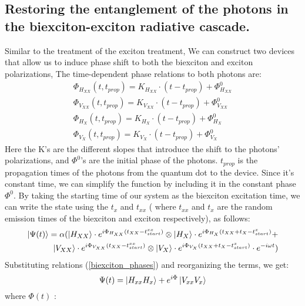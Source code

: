 \subsection*{Restoring the entanglement of the photons in the biexciton-exciton radiative cascade.}
Similar to the treatment of the exciton treatment, We can construct two devices that allow us to induce phase shift to both the biexciton and exciton polarizations, The time-dependent phase relations to both photons are: 
\begin{equation} \label{biexciton_phases}
	\begin{aligned} 
		&\Phi_{H_{XX}}{(t,t_{prop})} = K_{H_{XX}}\cdot(t-t_{prop}) + \Phi^0_{H_{XX}} & \\	&\Phi_{V_{XX}}{(t,t_{prop})} = K_{V_{XX}}\cdot(t-t_{prop}) + \Phi^0_{V_{XX}} \\
		&\Phi_{H_{X}}{(t,t_{prop})} = K_{H_{X}}\cdot(t-t_{prop}) + \Phi^0_{H_{X}} &\\
		&\Phi_{V_{X}}{(t,t_{prop})} = K_{V_{X}}\cdot(t-t_{prop}) + \Phi^0_{V_{X}} 
	\end{aligned}
\end{equation}
Here the K's are the different slopes that introduce the shift to the photons' polarizations, and  $\Phi^0$'s are the initial phase of the photons. $t_{prop}$ is the propagation times of the photons from the quantum dot to the device. Since it's constant time, we can simplify the function by including it in the constant phase $\Phi^0$.
By taking the starting time of our system as the biexciton excitation time, we can write the state using the $t_x$ and $t_{xx}$ ( where $t_{xx}$ and $t_{x}$ are the random emission times of the biexciton and exciton respectively), as follows:
\begin{equation}
	\begin{split}
		\ket{\Psi(t)}= \alpha(\ket{H_{XX}}\cdot e^{i\Phi_{H_{XX}}(t_{XX}-t^{xx}_{start})} \otimes 
		\ket{H_{X}}\cdot e^{i\Phi_{H_{X}}(t_{XX}+t_{X}-t^{x}_{start})}+\\
		\ket{V_{XX}}\cdot e^{i\Phi_{V_{XX}}(t_{XX}-t^{xx}_{start})} \otimes 
		\ket{V_{X}}\cdot e^{i\Phi_{V_{X}}(t_{XX}+t_{X}-t^{x}_{start})}\cdot e^{-i\omega t})	
	\end{split}
\end{equation} 
Substituting relations (\ref{biexciton_phases}) and reorganizing the terms, we get:
\begin{equation}
	\Psi(t) = \ket{H_{xx}H_x}+e^{i\Phi}\ket{V_{xx}V_x}
\end{equation}
where $\Phi(t)$ :

